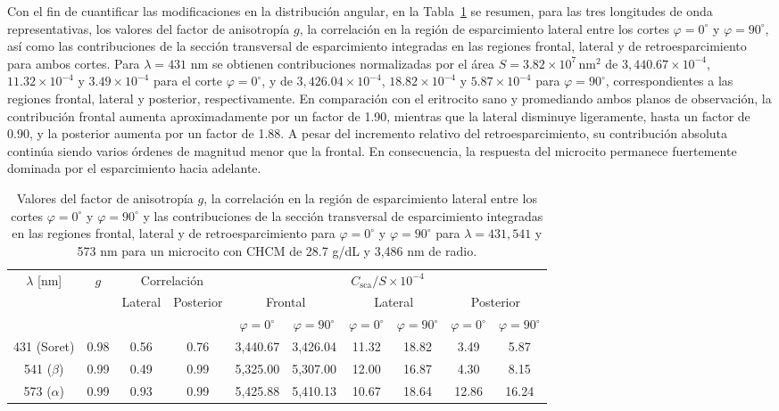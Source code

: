 Con el fin de cuantificar las modificaciones en la distribución angular, en la Tabla~\ref{table:val_micro} se resumen, para las tres longitudes de onda representativas, los valores del factor de anisotropía $g$, la correlación en la región de esparcimiento lateral entre los cortes $\varphi=0^\circ$ y $\varphi=90^\circ$, así como las contribuciones de la sección transversal de esparcimiento integradas en las regiones frontal, lateral y de retroesparcimiento para ambos cortes.  Para $\lambda=431$ nm se obtienen contribuciones normalizadas por el área $S=3.82\times 10^{7}\,\text{nm}^2$  de $3,440.67\times 10^{-4}$, $11.32\times 10^{-4}$ y $3.49\times 10^{-4}$ para el corte $\varphi=0^{\circ}$, y de $3,426.04\times 10^{-4}$, $18.82\times 10^{-4}$ y $5.87\times 10^{-4}$ para $\varphi=90^{\circ}$, correspondientes a las regiones frontal, lateral y posterior, respectivamente. En comparación con el eritrocito sano y promediando ambos planos de observación, la contribución frontal aumenta aproximadamente por un factor de 1.90, mientras que la lateral disminuye ligeramente, hasta un factor de 0.90, y la posterior aumenta por un factor de 1.88. A pesar del incremento relativo del retroesparcimiento, su contribución absoluta continúa siendo varios órdenes de magnitud menor que la frontal. En consecuencia, la respuesta del microcito permanece fuertemente dominada por el esparcimiento hacia adelante.
%
\begin{table}[h!]
	\setlength{\tabcolsep}{4pt}
	\begin{tabular}{cccccccccc}
		\hline
		\multirow{3}{*}{$\lambda$ [nm]} & \multirow{3}{*}{$g$} & \multicolumn{2}{c}{Correlación} & \multicolumn{6}{c}{$C_{\text{sca}}/S\times 10^{-4}$ } \\
		\cline{5-10}
		& & \multirow{2}{*}{Lateral} &  \multirow{2}{*}{Posterior}&  \multicolumn{2}{c}{Frontal} & \multicolumn{2}{c}{Lateral} & \multicolumn{2}{c}{Posterior}\\
		\cline{5-10}
		&  &  &  &  $\varphi=0^{\circ}$ & $\varphi=90^{\circ}$ &$\varphi=0^{\circ}$ & $\varphi=90^{\circ}$ &$\varphi=0^{\circ}$ & $\varphi=90^{\circ}$ \\ \hline
		431 (Soret) & 0.98  & 0.56 & 0.76 & 3,440.67 & 3,426.04 & 11.32 & 18.82 & 3.49 & 5.87  \\
		541 ($\beta$) & 0.99 & 0.49 & 0.99 & 5,325.00 & 5,307.00 & 12.00 & 16.87 & 4.30 & 8.15\\
		573 ($\alpha$) & 0.99 & 0.93 & 0.99 & 5,425.88 & 5,410.13 & 10.67 & 18.64 & 12.86 & 16.24\\
		\hline
	\end{tabular}
	\caption{Valores del factor de anisotropía $g$, la correlación en la región de esparcimiento lateral entre los cortes $\varphi=0^\circ$ y $\varphi=90^\circ$ y las contribuciones de la sección transversal de esparcimiento integradas en las regiones frontal, lateral y de retroesparcimiento para $\varphi=0^{\circ}$ y $\varphi=90^{\circ}$ para $\lambda=431,541$ y 573 nm para un microcito con CHCM de 28.7 g/dL y 3,486 nm de radio. }
	\label{table:val_micro}
	\vspace{0.2cm} 
\end{table}
%






